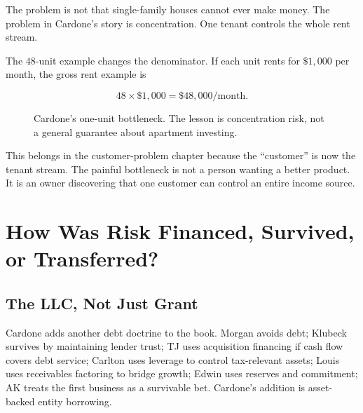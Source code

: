 \documentclass[11pt,oneside]{book}
\begin{document}
The problem is not that single-family houses cannot ever make money. The problem in Cardone's story is concentration. One tenant controls the whole rent stream.

The \(48\)-unit example changes the denominator. If each unit rents for \(\$1{,}000\) per month, the gross rent example is

\begin{equation}
48\times \$1{,}000
=
\$48{,}000/\mathrm{month}.
\end{equation}

\begin{figure}
\centering
{}
\caption{Cardone's one-unit bottleneck. The lesson is concentration risk, not a general guarantee about apartment investing.}
\end{figure}

This belongs in the customer-problem chapter because the ``customer'' is now the tenant stream. The painful bottleneck is not a person wanting a better product. It is an owner discovering that one customer can control an entire income source.

\chapter{How Was Risk Financed, Survived, or Transferred?}

\section{The LLC, Not Just Grant}

Cardone adds another debt doctrine to the book. Morgan avoids debt; Klubeck survives by maintaining lender trust; TJ uses acquisition financing if cash flow covers debt service; Carlton uses leverage to control tax-relevant assets; Louis uses receivables factoring to bridge growth; Edwin uses reserves and commitment; AK treats the first business as a survivable bet. Cardone's addition is asset-backed entity borrowing.
\end{document}
